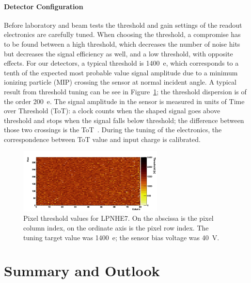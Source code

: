 \paragraph{Detector Configuration}
Before laboratory and beam tests the threshold and gain settings of the readout electronics are carefully tuned. When choosing the threshold, a compromise has to be found between a high threshold, which decreases the number of noise hits but decreases the signal efficiency as well, and a low threshold, with opposite effects. For our detectors, a typical threshold is 1400~e, which corresponds to a tenth of the expected most probable value signal amplitude due to a minimum ionizing particle (MIP) crossing the sensor at normal incident angle. A typical result from  threshold tuning\cite{FEI4,USBpix} can be see in Figure~\ref{fig:threshold}; the threshold dispersion is of the order 200~e. The signal amplitude in the sensor is measured in  units of Time over Threshold (ToT): a clock counts when the shaped signal  goes above threshold and stops when the signal falls below threshold; the difference between those two crossings is the ToT~\cite{FEI4}. During the tuning of the electronics, the correspondence between ToT value and input charge is calibrated.\\
\begin{figure}[!htb]
\centering
\includegraphics[width=0.65\textwidth]{lpnhe7_threshold_40V.png}
\caption{\label{fig:threshold}Pixel threshold values for LPNHE7. On the abscissa is the pixel column index, on the ordinate axis is the pixel row index.
The tuning target value was 1400~e; the sensor bias voltage was 40~V.}
\end{figure}

\section{Summary and Outlook}
\label{sec:itksummary}

